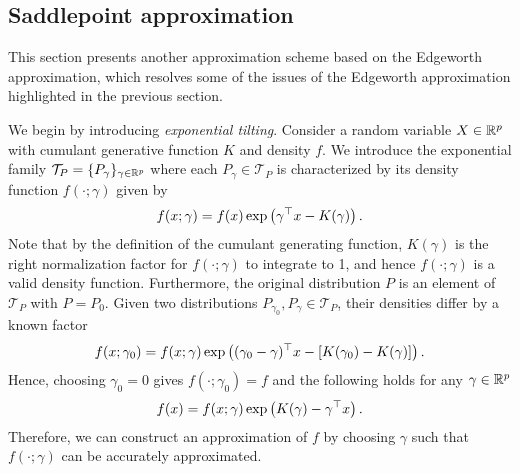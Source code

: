 \subsection{Saddlepoint approximation} \label{sec-saddlepoint}

This section presents another approximation scheme based on the Edgeworth approximation, which resolves some of the issues of the Edgeworth approximation highlighted in the previous section.

We begin by introducing \textit{exponential tilting}. Consider a random variable $X \in {\mathbb{R}^p}$ with cumulant generative function $K$ and density $f$. We introduce the exponential family $\mathcal{T}_P = \{ P_\gamma \}_{\gamma \in {\mathbb{R}^p}}$ where each $P_\gamma \in \mathcal{T}_P$ is characterized by its density function $f(\cdot; \gamma)$ given by
\begin{equation*}
    f(x; \gamma) = f(x)\exp\left(\gamma^\top x - K(\gamma)\right).
\end{equation*}
Note that by the definition of the cumulant generating function, $K(\gamma)$ is the right normalization factor for $f(\cdot; \gamma)$ to integrate to 1, and hence $f(\cdot; \gamma)$ is a valid density function. Furthermore, the original distribution $P$ is an element of $\mathcal{T}_P$ with $P = P_0$. Given two distributions $P_{\gamma_0}, P_\gamma \in \mathcal{T}_P$, their densities differ by a known factor
\begin{equation*}
    f(x; \gamma_0) = f(x; \gamma)\exp\left((\gamma_0 - \gamma)^\top x - \left[K(\gamma_0) - K(\gamma)\right]\right).
\end{equation*} 
Hence, choosing $\gamma_0 = 0$ gives $f(\cdot; \gamma_0) = f$ and the following holds for any $\gamma \in {\mathbb{R}^p}$
\begin{equation} \label{eq-saddlepoint-original}
    f(x) = f(x; \gamma)\exp\left(K(\gamma) - \gamma^\top x\right).
\end{equation}
Therefore, we can construct an approximation of $f$ by choosing $\gamma$ such that $f(\cdot; \gamma)$ can be accurately approximated.

